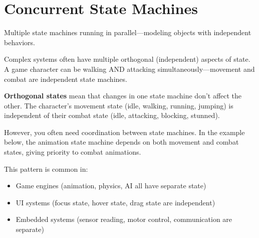 \section{Concurrent State Machines}

Multiple state machines running in parallel—modeling objects with independent behaviors.

Complex systems often have multiple orthogonal (independent) aspects of state. A game character can be walking AND attacking simultaneously—movement and combat are independent state machines.

\textbf{Orthogonal states} mean that changes in one state machine don't affect the other. The character's movement state (idle, walking, running, jumping) is independent of their combat state (idle, attacking, blocking, stunned).

However, you often need coordination between state machines. In the example below, the animation state machine depends on both movement and combat states, giving priority to combat animations.

This pattern is common in:
\begin{itemize}
    \item Game engines (animation, physics, AI all have separate state)
    \item UI systems (focus state, hover state, drag state are independent)
    \item Embedded systems (sensor reading, motor control, communication are separate)
\end{itemize}

